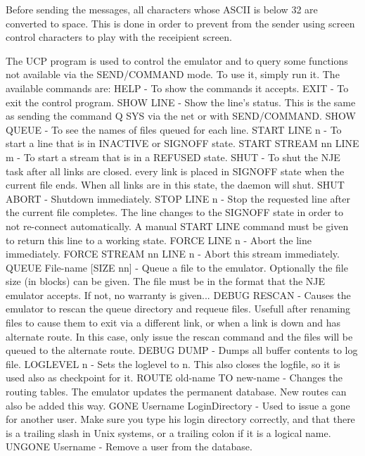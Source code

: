 Before  sending  the messages, all characters whose ASCII is below 32
are converted to space. This is done in order to prevent from the sender
using screen control characters to play with the receipient screen.
\vfill\eject


The  UCP  program  is  used to control the emulator and to query some
functions not available via the SEND/COMMAND mode. To use it, simply run
it. The available commands are:
\hfill\break
{\ncrBold HELP} - To show the commands it accepts.
EXIT - To exit the control program.
\hfill\break
{\ncrBold SHOW  LINE}  -  Show  the  line's status. This is the same as
sending the
command Q SYS via the net or with SEND/COMMAND.
\hfill\break
{\ncrBold SHOW QUEUE} - To see the names of files queued for each line.
\hfill\break
{\ncrBold START LINE n} - To start a line that is in INACTIVE or SIGNOFF state.
\hfill\break
{\ncrBold START STREAM nn LINE m} -
To start a stream that is in a REFUSED state.
\hfill\break
{\ncrBold SHUT} -
To shut the NJE task after all links are closed.  every  link  is
placed  in  SIGNOFF state when the current file ends. When all links are
in this state, the daemon will shut.
\hfill\break
{\ncrBold SHUT ABORT} - Shutdown immediately.
\hfill\break
{\ncrBold STOP LINE n} -
Stop the requested line after the current file  completes.
The  line  changes  to  the  SIGNOFF  state  in  order to not re-connect
automatically. A manual START LINE command must be given to return  this
line to a working state.
\hfill\break
{\ncrBold FORCE LINE n} - Abort the line immediately.
\hfill\break
{\ncrBold FORCE STREAM nn LINE n} - Abort this stream immediately.
\hfill\break
{\ncrBold QUEUE File-name [SIZE nn]} - Queue a file to the emulator.
Optionally the
file size (in blocks) can be given. The file must be in the format  that
the NJE emulator accepts. If not, no warranty is given...
\hfill\break
{\ncrBold DEBUG  RESCAN}
-  Causes  the emulator to rescan the queue directory and
requeue files. Usefull after renaming files to cause them to exit via  a
different  link, or when a link is down and has alternate route. In this
case, only issue the rescan command and the files will be queued to  the
alternate route.
\hfill\break
{\ncrBold DEBUG DUMP} - Dumps all buffer contents to log file.
\hfill\break
{\ncrBold LOGLEVEL n}
 - Sets the loglevel to n. This also closes the logfile, so it
is used also as checkpoint for it.
\hfill\break
{\ncrBold ROUTE old-name TO new-name}
- Changes the routing  tables.  The  emulator
updates the permanent database. New routes can also be added this way.
GONE  Username  LoginDirectory  - Used to issue a gone for another user.
Make sure you type his login directory correctly, and that  there  is  a
trailing  slash  in Unix systems, or a trailing colon if it is a logical
name.
\hfill\break
{\ncrBold UNGONE Username} - Remove a user from the database.

